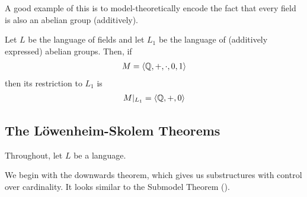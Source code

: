 A good example of this is to model-theoretically encode the fact that every field is also an abelian group (additively).

\begin{boxexample}
    Let $L$ be the language of fields and let $L_1$ be the language of (additively expressed) abelian groups. Then, if
    \begin{align*}
        M = \left\langle \mathbb{Q}, +, \cdot, 0, 1 \right\rangle
    \end{align*}
    then its restriction to $L_1$ is
    \begin{align*}
        M\vert_{L_1} = \left\langle \mathbb{Q}, +, 0 \right\rangle
    \end{align*}
\end{boxexample}

\subsection{The Löwenheim-Skolem Theorems}

Throughout, let $L$ be a language.

We begin with the downwards theorem, which gives us substructures with control over cardinality. It looks similar to the Submodel Theorem ().

